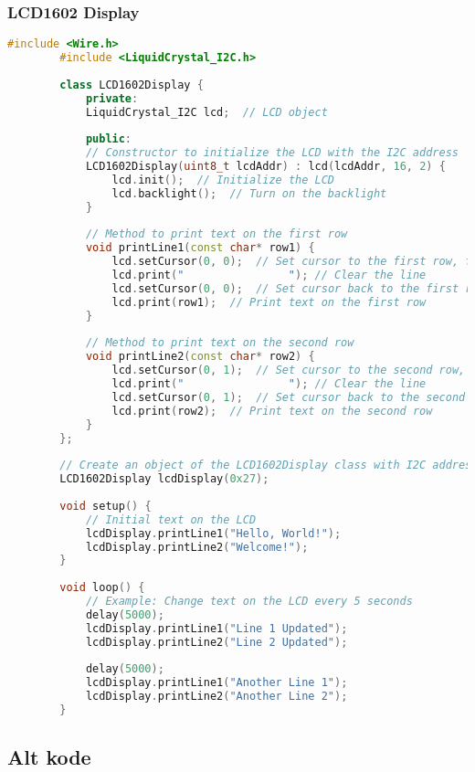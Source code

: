 	\subsubsection*{LCD1602 Display}
	\begin{lstlisting}[language=C++]
		#include <Wire.h>
		#include <LiquidCrystal_I2C.h>
		
		class LCD1602Display {
			private:
			LiquidCrystal_I2C lcd;  // LCD object
			
			public:
			// Constructor to initialize the LCD with the I2C address
			LCD1602Display(uint8_t lcdAddr) : lcd(lcdAddr, 16, 2) {
				lcd.init();  // Initialize the LCD
				lcd.backlight();  // Turn on the backlight
			}
			
			// Method to print text on the first row
			void printLine1(const char* row1) {
				lcd.setCursor(0, 0);  // Set cursor to the first row, first column
				lcd.print("                "); // Clear the line
				lcd.setCursor(0, 0);  // Set cursor back to the first row
				lcd.print(row1);  // Print text on the first row
			}
			
			// Method to print text on the second row
			void printLine2(const char* row2) {
				lcd.setCursor(0, 1);  // Set cursor to the second row, first column
				lcd.print("                "); // Clear the line
				lcd.setCursor(0, 1);  // Set cursor back to the second row
				lcd.print(row2);  // Print text on the second row
			}
		};
		
		// Create an object of the LCD1602Display class with I2C address 0x27
		LCD1602Display lcdDisplay(0x27);
		
		void setup() {
			// Initial text on the LCD
			lcdDisplay.printLine1("Hello, World!");
			lcdDisplay.printLine2("Welcome!");
		}
		
		void loop() {
			// Example: Change text on the LCD every 5 seconds
			delay(5000);
			lcdDisplay.printLine1("Line 1 Updated");
			lcdDisplay.printLine2("Line 2 Updated");
			
			delay(5000);
			lcdDisplay.printLine1("Another Line 1");
			lcdDisplay.printLine2("Another Line 2");
		}
	\end{lstlisting}
	
	\subsection*{Alt kode}
	\begin{lstlisting}
		
	\end{lstlisting}